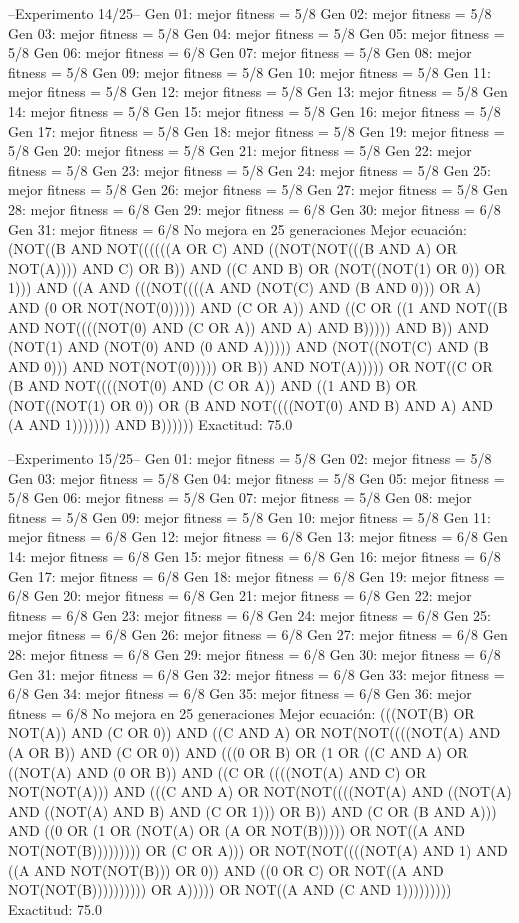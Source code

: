 --Experimento 
 14/25--
Gen 01: mejor fitness = 5/8
Gen 02: mejor fitness = 5/8
Gen 03: mejor fitness = 5/8
Gen 04: mejor fitness = 5/8
Gen 05: mejor fitness = 5/8
Gen 06: mejor fitness = 6/8
Gen 07: mejor fitness = 5/8
Gen 08: mejor fitness = 5/8
Gen 09: mejor fitness = 5/8
Gen 10: mejor fitness = 5/8
Gen 11: mejor fitness = 5/8
Gen 12: mejor fitness = 5/8
Gen 13: mejor fitness = 5/8
Gen 14: mejor fitness = 5/8
Gen 15: mejor fitness = 5/8
Gen 16: mejor fitness = 5/8
Gen 17: mejor fitness = 5/8
Gen 18: mejor fitness = 5/8
Gen 19: mejor fitness = 5/8
Gen 20: mejor fitness = 5/8
Gen 21: mejor fitness = 5/8
Gen 22: mejor fitness = 5/8
Gen 23: mejor fitness = 5/8
Gen 24: mejor fitness = 5/8
Gen 25: mejor fitness = 5/8
Gen 26: mejor fitness = 5/8
Gen 27: mejor fitness = 5/8
Gen 28: mejor fitness = 6/8
Gen 29: mejor fitness = 6/8
Gen 30: mejor fitness = 6/8
Gen 31: mejor fitness = 6/8
No mejora en 25 generaciones
Mejor ecuación: (NOT((B AND NOT((((((A OR C) AND ((NOT(NOT(((B AND A) OR NOT(A)))) AND C) OR B)) AND ((C AND B) OR (NOT((NOT(1) OR 0)) OR 1))) AND ((A AND (((NOT((((A AND (NOT(C) AND (B AND 0))) OR A) AND (0 OR NOT(NOT(0))))) AND (C OR A)) AND ((C OR ((1 AND NOT((B AND NOT((((NOT(0) AND (C OR A)) AND A) AND B))))) AND B)) AND (NOT(1) AND (NOT(0) AND (0 AND A))))) AND (NOT((NOT(C) AND (B AND 0))) AND NOT(NOT(0))))) OR B)) AND NOT(A))))) OR NOT((C OR (B AND NOT((((NOT(0) AND (C OR A)) AND ((1 AND B) OR (NOT((NOT(1) OR 0)) OR (B AND NOT((((NOT(0) AND B) AND A) AND (A AND 1))))))) AND B))))))
 Exactitud: 75.0%

--Experimento 
 15/25--
Gen 01: mejor fitness = 5/8
Gen 02: mejor fitness = 5/8
Gen 03: mejor fitness = 5/8
Gen 04: mejor fitness = 5/8
Gen 05: mejor fitness = 5/8
Gen 06: mejor fitness = 5/8
Gen 07: mejor fitness = 5/8
Gen 08: mejor fitness = 5/8
Gen 09: mejor fitness = 5/8
Gen 10: mejor fitness = 5/8
Gen 11: mejor fitness = 6/8
Gen 12: mejor fitness = 6/8
Gen 13: mejor fitness = 6/8
Gen 14: mejor fitness = 6/8
Gen 15: mejor fitness = 6/8
Gen 16: mejor fitness = 6/8
Gen 17: mejor fitness = 6/8
Gen 18: mejor fitness = 6/8
Gen 19: mejor fitness = 6/8
Gen 20: mejor fitness = 6/8
Gen 21: mejor fitness = 6/8
Gen 22: mejor fitness = 6/8
Gen 23: mejor fitness = 6/8
Gen 24: mejor fitness = 6/8
Gen 25: mejor fitness = 6/8
Gen 26: mejor fitness = 6/8
Gen 27: mejor fitness = 6/8
Gen 28: mejor fitness = 6/8
Gen 29: mejor fitness = 6/8
Gen 30: mejor fitness = 6/8
Gen 31: mejor fitness = 6/8
Gen 32: mejor fitness = 6/8
Gen 33: mejor fitness = 6/8
Gen 34: mejor fitness = 6/8
Gen 35: mejor fitness = 6/8
Gen 36: mejor fitness = 6/8
No mejora en 25 generaciones
Mejor ecuación: (((NOT(B) OR NOT(A)) AND (C OR 0)) AND ((C AND A) OR NOT(NOT((((NOT(A) AND (A OR B)) AND (C OR 0)) AND (((0 OR B) OR (1 OR ((C AND A) OR ((NOT(A) AND (0 OR B)) AND ((C OR ((((NOT(A) AND C) OR NOT(NOT(A))) AND (((C AND A) OR NOT(NOT((((NOT(A) AND ((NOT(A) AND ((NOT(A) AND B) AND (C OR 1))) OR B)) AND (C OR (B AND A))) AND ((0 OR (1 OR (NOT(A) OR (A OR NOT(B))))) OR NOT((A AND NOT(NOT(B))))))))) OR (C OR A))) OR NOT(NOT((((NOT(A) AND 1) AND ((A AND NOT(NOT(B))) OR 0)) AND ((0 OR C) OR NOT((A AND NOT(NOT(B)))))))))) OR A))))) OR NOT((A AND (C AND 1)))))))))
 Exactitud: 75.0%


